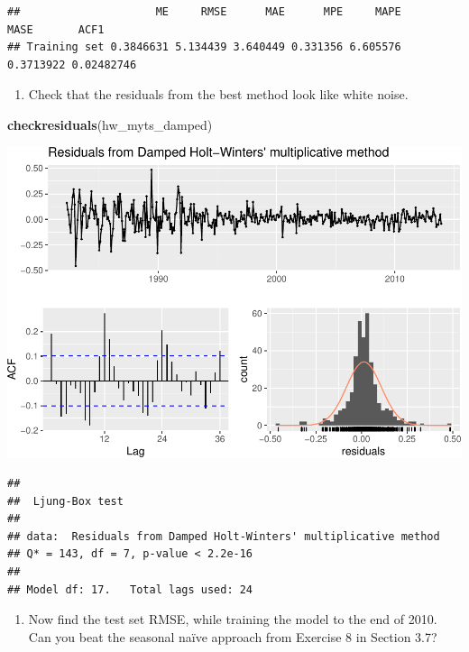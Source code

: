 \documentclass[]{article}
\newenvironment{Shaded}{\begin{snugshade}}{\end{snugshade}}
\newcommand{\KeywordTok}[1]{\textcolor[rgb]{0.13,0.29,0.53}{\textbf{#1}}}
\newcommand{\NormalTok}[1]{#1}
\providecommand{\tightlist}{%
  \setlength{\itemsep}{0pt}\setlength{\parskip}{0pt}}
\begin{document}
\begin{verbatim}
##                     ME     RMSE      MAE      MPE     MAPE      MASE       ACF1
## Training set 0.3846631 5.134439 3.640449 0.331356 6.605576 0.3713922 0.02482746
\end{verbatim}

\begin{enumerate}
\def\labelenumi{\alph{enumi})}
\setcounter{enumi}{3}
\tightlist
\item
  Check that the residuals from the best method look like white noise.
\end{enumerate}

\begin{Shaded}
\begin{Highlighting}[]
\KeywordTok{checkresiduals}\NormalTok{(hw_myts_damped)}
\end{Highlighting}
\end{Shaded}

\includegraphics{Hw4_files/figure-latex/unnamed-chunk-22-1.pdf}

\begin{verbatim}
## 
##  Ljung-Box test
## 
## data:  Residuals from Damped Holt-Winters' multiplicative method
## Q* = 143, df = 7, p-value < 2.2e-16
## 
## Model df: 17.   Total lags used: 24
\end{verbatim}

\begin{enumerate}
\def\labelenumi{\alph{enumi})}
\setcounter{enumi}{4}
\tightlist
\item
  Now find the test set RMSE, while training the model to the end of
  2010. Can you beat the seasonal naïve approach from Exercise 8 in
  Section 3.7?
\end{enumerate}
\end{document}
